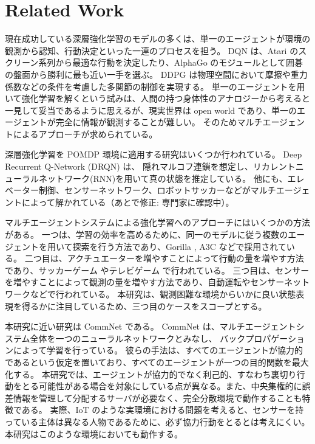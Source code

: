 \section{Related Work}
現在成功している深層強化学習のモデルの多くは、単一のエージェントが環境の観測から認知、行動決定といった一連のプロセスを担う。
DQN \citep{mnih2015human,silver2016mastering} は、Atari のスクリーン系列から最適な行動を決定したり、AlphaGo のモジュールとして囲碁の盤面から勝利に最も近い一手を選ぶ。
DDPG \citep{lillicrap2015continuous} は物理空間において摩擦や重力係数などの条件を考慮した多関節の制御を実現する。
単一のエージェントを用いて強化学習を解くという試みは、人間の持つ身体性のアナロジーから考えると一見して妥当であるように思えるが、現実世界は open world であり、単一のエージェントが完全に情報が観測することが難しい。
そのためマルチエージェントによるアプローチが求められている。

深層強化学習を POMDP 環境に適用する研究はいくつか行われている。
Deep Recurrent Q-Network (DRQN) \citep{sorokin2015deep} は、
隠れマルコフ連鎖を想定し、リカレントニューラルネットワーク(RNN)を用いて真の状態を推定している。
他にも、エレベーター制御\citep{crites1998elevator}、センサーネットワーク\citep{fox2000probabilistic}、ロボットサッカー\citep{stone1998towards}などがマルチエージェントによって解かれている（あとで修正: 専門家に確認中）。

マルチエージェントシステムによる強化学習へのアプローチにはいくつかの方法がある。
一つは、学習の効率を高めるために、同一のモデルに従う複数のエージェントを用いて探索を行う方法であり、Gorilla \citep{nair2015massively} , A3C \citep{mnih2016asynchronous} などで採用されている。
二つ目は、アクチュエーターを増やすことによって行動の量を増やす方法であり、サッカーゲーム \citep{kalyanakrishnan2006half} やテレビゲーム \citep{tampuu2017multiagent} で行われている。
三つ目は、センサーを増やすことによって観測の量を増やす方法であり、自動運転\citep{sukhbaatar2016learning}やセンサーネットワーク\citep{fox2000probabilistic}などで行われている。
本研究は、観測困難な環境からいかに良い状態表現を得るかに注目しているため、三つ目のケースをスコープとする。

本研究に近い研究は CommNet \citep{sukhbaatar2016learning} である。
CommNet は、マルチエージェントシステム全体を一つのニューラルネットワークとみなし、
バックプロパゲーションによって学習を行っている。
彼らの手法は、すべてのエージェントが協力的であるという仮定を置いており、すべてのエージェントが一つの目的関数を最大化する。
本研究では、エージェントが協力的でなく利己的、すなわち裏切り行動をとる可能性がある場合を対象にしている点が異なる。また、中央集権的に誤差情報を管理して分配するサーバが必要なく、完全分散環境で動作することも特徴である。
実際、IoT のような実環境における問題を考えると、センサーを持っている主体は異なる人物であるために、必ず協力行動をとるとは考えにくい。
本研究はこのような環境においても動作する。

